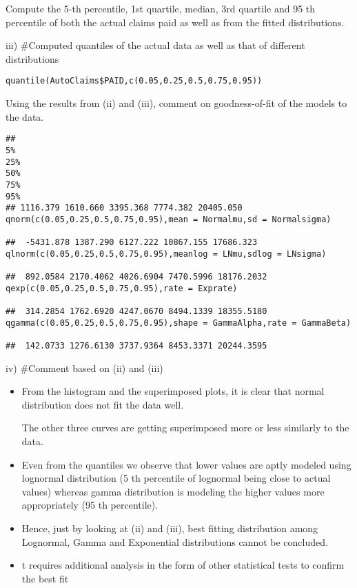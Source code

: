 \documentclass[a4paper,12pt]{article}
\begin{document}
\large 
\noindent Compute the 5-th percentile, 1st quartile, median, 3rd quartile and 95 th percentile of both
the actual claims paid as well as from the fitted distributions. 




iii)
#Computed quantiles of the actual data as well as that of different distributions

\begin{framed}
\begin{verbatim}
quantile(AutoClaims$PAID,c(0.05,0.25,0.5,0.75,0.95))
\end{verbatim}
\end{framed}


\newpage 
\noindent Using the results from (ii) and (iii), comment on goodness-of-fit of the models to the
data.


\begin{framed}
\begin{verbatim}
##
5%
25%
50%
75%
95%
## 1116.379 1610.660 3395.368 7774.382 20405.050
qnorm(c(0.05,0.25,0.5,0.75,0.95),mean = Normalmu,sd = Normalsigma)

##  -5431.878 1387.290 6127.222 10867.155 17686.323
qlnorm(c(0.05,0.25,0.5,0.75,0.95),meanlog = LNmu,sdlog = LNsigma)

##  892.0584 2170.4062 4026.6904 7470.5996 18176.2032
qexp(c(0.05,0.25,0.5,0.75,0.95),rate = Exprate)

##  314.2854 1762.6920 4247.0670 8494.1339 18355.5180
qgamma(c(0.05,0.25,0.5,0.75,0.95),shape = GammaAlpha,rate = GammaBeta)

##  142.0733 1276.6130 3737.9364 8453.3371 20244.3595
\end{verbatim}
\end{framed}
iv)
#Comment based on (ii) and (iii)


\begin{itemize}
    \item From the histogram and the superimposed plots, it is clear that normal distribution does not
fit the data well.

The other three curves are getting superimposed more or less similarly to the data. 
\item Even from the quantiles we observe that lower values are aptly modeled using lognormal distribution (5 th percentile of lognormal being close to actual values) whereas gamma distribution is modeling the higher values more appropriately (95 th percentile).
\item Hence, just by looking at (ii) and (iii), best fitting distribution among Lognormal, Gamma and
Exponential distributions cannot be concluded. 
\item t requires additional analysis in the form of other statistical tests to confirm the best fit
\end{itemize}
\end{document}
